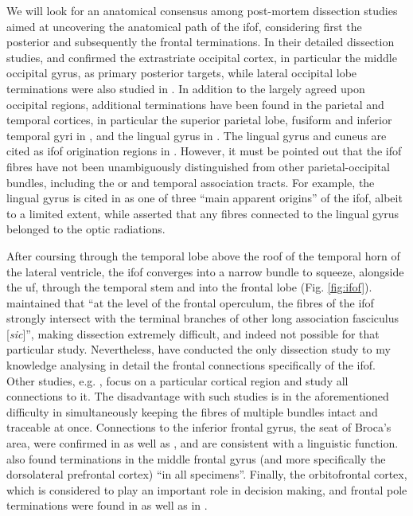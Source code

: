 We will look for an anatomical consensus among post-mortem dissection studies aimed at uncovering the anatomical path of the \gls{ifof}, considering first the posterior and subsequently the frontal terminations.
In their detailed dissection studies, \textcite{Martino2010} and \textcite{Sarubbo2013} confirmed the extrastriate occipital cortex, in particular the middle occipital gyrus, as primary posterior targets, while lateral occipital lobe terminations were also studied in \textcite{Palejwala2020}.
In addition to the largely agreed upon occipital regions, additional terminations have been found in the parietal and temporal cortices, in particular the superior parietal lobe, fusiform and inferior temporal gyri in \textcite{Martino2010}, and the lingual gyrus in \textcite{Sarubbo2013}.
The lingual gyrus and cuneus are cited as \gls{ifof} origination regions in \textcite{Palejwala2021}.
However, it must be pointed out that the \gls{ifof} fibres have not been unambiguously distinguished from other parietal-occipital bundles, including the \gls{or} and temporal association tracts.
For example, the lingual gyrus is cited in \textcite{Sarubbo2013} as one of three ``main apparent origins'' of the \gls{ifof}, albeit to a limited extent, while \textcite{Martino2010} asserted that any fibres connected to the lingual gyrus belonged to the optic radiations.

After coursing through the temporal lobe above the roof of the temporal horn of the lateral ventricle\autocite{Martino2010,Kljajevic2014a}, the \gls{ifof} converges into a narrow bundle to squeeze, alongside the \gls{uf}, through the temporal stem and into the frontal lobe (Fig. \ref{fig:ifof})\autocite{Martino2010,Sarubbo2013}.
\textcite{Martino2010} maintained that ``at the level of the frontal operculum, the fibres of the \gls{ifof} strongly intersect with the terminal branches of other long association fasciculus [\textit{sic}]'', making dissection extremely difficult, and indeed not possible for that particular study.
Nevertheless, \textcite{Sarubbo2013} have conducted the only dissection study to my knowledge analysing in detail the frontal connections specifically of the \gls{ifof}.
Other studies, e.g. \textcite{Burks2017}, focus on a particular cortical region and study all connections to it.
The disadvantage with such studies is in the aforementioned difficulty in simultaneously keeping the fibres of multiple bundles intact and traceable at once.
Connections to the inferior frontal gyrus, the seat of Broca's area, were confirmed in \textcite{Sarubbo2013} as well as \textcite{Hau2016}, and are consistent with a linguistic function.
\textcite{Sarubbo2013} also found terminations in the middle frontal gyrus (and more specifically the dorsolateral prefrontal cortex) ``in all specimens''.
Finally, the orbitofrontal cortex, which is considered to play an important role in decision making, and frontal pole terminations were found in \textcite{Sarubbo2013} as well as in \textcite{Burks2017}.

